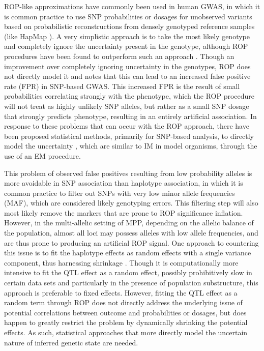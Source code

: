 ROP-like approximations have commonly been used in human GWAS, in which it is common practice to use SNP probabilities or dosages for unobserved variants based on probabilistic reconstructions from densely genotyped reference samples (like HapMap \citep{Gibbs2003}). A very simplistic approach is to take the most likely genotype and completely ignore the uncertainty present in the genotype, although ROP procedures have been found to outperform such an approach \citep{Li2009, Aulchenko2010, Marchini2010, Zheng2011}. Though an improvement over completely ignoring uncertainty in the genotypes, ROP does not directly model it and \cite{Kutalik2011} notes that this can lead to an increased false positive rate (FPR) in SNP-based GWAS. This increased FPR is the result of small probabilities correlating strongly with the phenotype, which the ROP procedure will not treat as highly unlikely SNP alleles, but rather as a small SNP dosage that strongly predicts phenotype, resulting in an entirely artificial association. In response to these problems that can occur with the ROP approach, there have been proposed statistical methods, primarily for SNP-based analysis, to directly model the uncertainty \citep{Kutalik2011, Acar2013}, which are similar to IM in model organisms, through the use of an EM procedure. 

This problem of observed false positives resulting from low probability alleles is more avoidable in SNP association than haplotype association, in which it is common practice to filter out SNPs with very low minor allele frequencies (MAF), which are considered likely genotyping errors. This filtering step will also most likely remove the markers that are prone to ROP significance inflation. However, in the multi-allelic setting of MPP, depending on the allelic balance of the population, almost all loci may possess alleles with low allele frequencies, and are thus prone to producing an artificial ROP signal. One approach to countering this issue is to fit the haplotype effects as random effects with a single variance component, thus harnessing shrinkage \citep{Verbyla2014, Wei2016}. Though it is computationally more intensive to fit the QTL effect as a random effect, possibly prohibitively slow in certain data sets and particularly in the presence of population substructure, this approach is preferable to fixed effects. However, fitting the QTL effect as a random term through ROP does not directly address the underlying issue of potential correlations between outcome and probabilities or dosages, but does happen to greatly restrict the problem by dynamically shrinking the potential effects. As such, statistical approaches that more directly model the uncertain nature of inferred genetic state are needed.

